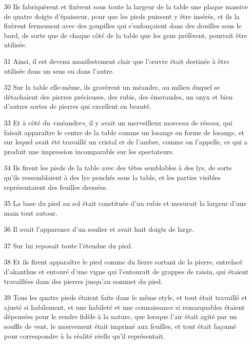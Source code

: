 \par 30 Ils fabriquèrent et fixèrent sous toute la largeur de la table une plaque massive de quatre doigts d'épaisseur, pour que les pieds puissent y être insérés, et ils la fixèrent fermement avec des goupilles qui s'enfonçaient dans des douilles sous le bord, de sorte que de chaque côté de la table que les gens préfèrent, pourrait être utilisée.

\par 31 Ainsi, il est devenu manifestement clair que l'œuvre était destinée à être utilisée dans un sens ou dans l'autre.

\par 32 Sur la table elle-même, ils gravèrent un méandre, au milieu duquel se détachaient des pierres précieuses, des rubis, des émeraudes, un onyx et bien d'autres sortes de pierres qui excellent en beauté.

\par 33 Et à côté du «méandre», il y avait un merveilleux morceau de réseau, qui faisait apparaître le centre de la table comme un losange en forme de losange, et sur lequel avait été travaillé un cristal et de l'ambre, comme on l'appelle, ce qui a produit une impression incomparable sur les spectateurs.

\par 34 Ils firent les pieds de la table avec des têtes semblables à des lys, de sorte qu'ils ressemblaient à des lys penchés sous la table, et les parties visibles représentaient des feuilles dressées.

\par 35 La base du pied au sol était constituée d'un rubis et mesurait la largeur d'une main tout autour.

\par 36 Il avait l'apparence d'un soulier et avait huit doigts de large.

\par 37 Sur lui reposait toute l'étendue du pied.

\par 38 Et ils firent apparaître le pied comme du lierre sortant de la pierre, entrelacé d'akanthus et entouré d'une vigne qui l'entourait de grappes de raisin, qui étaient travaillées dans des pierres jusqu'au sommet du pied.

\par 39 Tous les quatre pieds étaient faits dans le même style, et tout était travaillé et ajusté si habilement, et une habileté et une connaissance si remarquables étaient dépensées pour le rendre fidèle à la nature, que lorsque l'air était agité par un souffle de vent, le mouvement était imprimé aux feuilles, et tout était façonné pour correspondre à la réalité réelle qu'il représentait.

